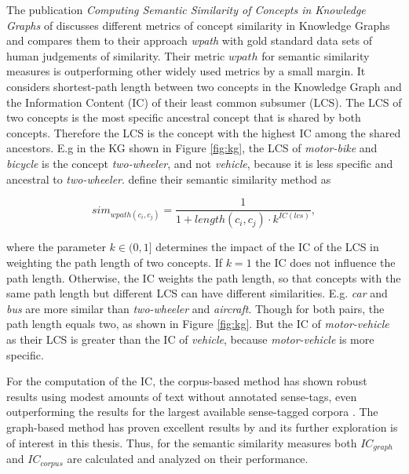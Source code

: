\documentclass[pdftex,a4paper,12pt]{scrartcl}
\theoremstyle{definition}
\begin{document}
The publication \textit{Computing  Semantic  Similarity of  Concepts in Knowledge Graphs} of \citet{zhu_computing_2017} discusses different metrics of concept similarity in Knowledge Graphs and compares them to their approach \textit{wpath} with gold standard data sets of human judgements of similarity. Their metric $wpath$ for semantic similarity measures is outperforming other widely used metrics by a small margin. It considers shortest-path length between two concepts in the Knowledge Graph and the Information Content (IC) of their least common subsumer (LCS). The LCS of two concepts is the most specific ancestral concept that is shared by both concepts. Therefore the LCS is the concept with the highest IC among the shared ancestors. E.g in the KG shown in Figure \ref{fig:kg}, the LCS of \textit{motor-bike} and \textit{bicycle} is the concept \textit{two-wheeler}, and not \textit{vehicle}, because it is less specific and ancestral to \textit{two-wheeler}. \citep{zhu_computing_2017} define their semantic similarity method as

\begin{equation}
    sim_{wpath(c_i,c_j)} = \frac{1}{1+length(c_i,c_j) \cdot k^{IC(lcs)}},
\end{equation}

where the parameter $k \in (0,1]$ determines the impact of the IC of the LCS in weighting the path length of two concepts. If $k = 1$ the IC does not influence the path length. Otherwise, the IC weights the path length, so that concepts with the same path length but different LCS can have different similarities. E.g. \textit{car} and \textit{bus} are more similar than \textit{two-wheeler} and \textit{aircraft}. Though for both pairs, the path length equals two, as shown in Figure \ref{fig:kg}. But the IC of \textit{motor-vehicle} as their LCS is greater than the IC of \textit{vehicle}, because \textit{motor-vehicle} is more specific. 

For the computation of the IC, the corpus-based method has shown robust results using modest amounts of text without annotated sense-tags, even outperforming the results for the largest available sense-tagged corpora \citep{pedersen_information_2010}. The graph-based method has proven excellent results by \citet{zhu_computing_2017} and its further exploration is of interest in this thesis. Thus, for the semantic similarity measures both $IC_{graph}$ and $IC_{corpus}$ are calculated and analyzed on their performance.
 
\end{document}
